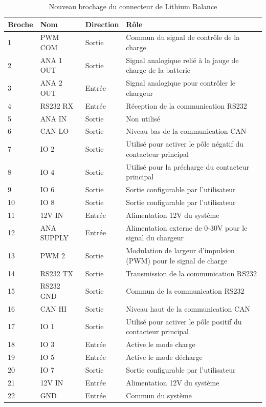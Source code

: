 	\begin{table}[H]
		\centering
		\caption{Nouveau brochage du connecteur de Lithium Balance}
		\label{22CLithiumBalance}	
		\begin{tabular}{ | l | l | l | l | }
			\hline
			Broche & Nom & Direction & Rôle \\ \hline
			1 & PWM COM & Sortie & Commun du signal de contrôle de la charge \\ \hline
			2 & ANA 1 OUT & Sortie & Signal analogique relié à la jauge de charge de la batterie \\ \hline
			3 & ANA 2 OUT & Entrée & Signal analogique pour contrôler le chargeur \\ \hline
			4 & RS232 RX & Entrée & Réception de la communication RS232 \\ \hline
			5 & ANA IN & Sortie & Non utilisé \\ \hline
			6 & CAN LO & Sortie & Niveau bas de la communication CAN \\ \hline
			7 & IO 2 & Sortie & Utilisé pour activer le pôle négatif du contacteur principal \\ \hline
			8 & IO 4 & Sortie & Utilisé pour la précharge du contacteur principal \\ \hline
			9 & IO 6 & Sortie & Sortie configurable par l'utilisateur \\ \hline
			10 & IO 8 & Sortie & Sortie configurable par l'utilisateur \\ \hline
			11 & 12V IN & Entrée & Alimentation 12V du système \\ \hline
			12 & ANA SUPPLY & Entrée & Alimentation externe de 0-30V pour le signal du chargeur \\ \hline
			13 & PWM 2 & Sortie & Modulation de largeur d'impulsion (PWM) pour le signal de charge \\ \hline
			14 & RS232 TX & Sortie & Transmission de la communication RS232 \\ \hline
			15 & RS232 GND & Sortie & Commun de la communication RS232 \\ \hline
			16 & CAN HI & Sortie & Niveau haut de la communication CAN \\ \hline
			17 & IO 1  & Sortie & Utilisé pour activer le pôle positif du contacteur principal \\ \hline
			18 & IO 3 & Entrée & Active le mode charge \\ \hline
			19 & IO 5 & Entrée & Active le mode décharge \\ \hline
			20 & IO 7 & Sortie & Sortie configurable par l'utilisateur \\ \hline
			21 & 12V IN & Entrée & Alimentation 12V du système \\ \hline
			22 & GND & Entrée & Commun du système \\ \hline
		\end{tabular}			
	\end{table}

